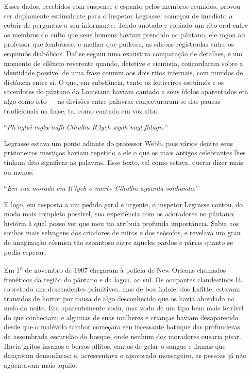 \begin{pages}
\begin{Rightside}
Esses dados, recebidos com suspense e espanto pelos membros reunidos,
provou ser duplamente estimulante para o inspetor Legrasse: começou de
imediato a cobrir de perguntas o seu informante. Tendo anotado e copiado
um rito oral entre os membros do culto que seus homens haviam prendido
no pântano, ele rogou ao professor que lembrasse, o melhor que pudesse,
as sílabas registradas entre os esquimós diabólicos. Daí se seguiu uma
exaustiva comparação de detalhes, e um momento de silêncio reverente
quando, detetive e cientista, concordaram sobre a identidade possível de
uma frase comum aos dois ritos infernais, com mundos de distância entre
si. O que, em substância, tanto os feiticeiros esquimós e os sacerdotes
do pântano da Louisiana haviam cantado a seus ídolos aparentados era
algo como isto --- as divisões entre palavras conjecturaram-se das
pausas tradicionais na frase, tal como cantada em voz alta:

``\emph{Ph'nglui mglw'nafh Cthulhu R'lyeh wgah'nagl fhtagn.}''

Legrasse estava um ponto adiante do professor Webb, pois vários dentre
seus prisioneiros mestiços haviam repetido a ele o que os mais antigos
celebrantes lhes tinham dito significar as palavras. Esse texto, tal
como estava, queria dizer mais ou menos:

``\emph{Em sua morada em R'lyeh o morto Cthulhu aguarda sonhando.}''

E logo, em resposta a um pedido geral e urgente, o inspetor Legrasse
contou, do modo mais completo possível, sua experiência com os
adoradores no pântano; história à qual posso ver que meu tio atribuía
profunda importância. Sabia aos sonhos mais selvagens dos criadores de
mitos e dos teósofos, e revelava um grau de imaginação cósmica tão
espantoso entre aqueles pardos e párias quanto se podia esperar.

Em 1\textsuperscript{o} de novembro de 1907 chegaram à polícia de
New Orleans chamados frenéticos da região do pântano e da lagoa, ao sul.
Os ocupantes clandestinos lá, sobretudo uns descendentes primitivos, mas
de boa índole, dos Lafitte,
estavam transidos de horror por causa de algo desconhecido que os havia
abordado no meio da noite. Era aparentemente vodu, mas vodu de um tipo
bem mais terrível do que conheciam; e algumas de suas mulheres e
crianças haviam desaparecido desde que o malévolo tambor começara seu
incessante batuque das profundezas da assombrada escuridão do bosque,
onde nenhum dos moradores ousaria pisar. Havia gritos insanos e berros
aflitos, cantos de gelar o sangue e flamas que dançavam demoníacas; e,
acrescentava o apavorado mensageiro, as pessoas já não aguentavam mais
aquilo.


\end{Rightside}
\end{pages}
